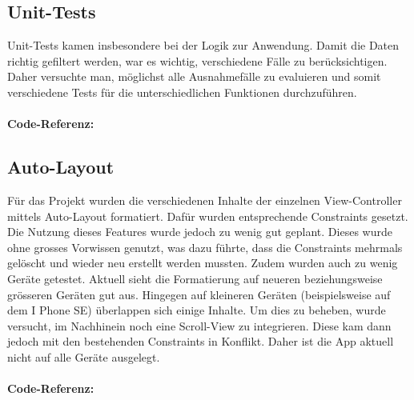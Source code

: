 \documentclass[12pt,titlepage]{article}
\begin{document}
\subsection{Unit-Tests}
Unit-Tests kamen insbesondere bei der Logik zur Anwendung. Damit die Daten richtig gefiltert werden, war es wichtig, verschiedene Fälle zu berücksichtigen. Daher versuchte man, möglichst alle Ausnahmefälle zu evaluieren und somit verschiedene Tests für die unterschiedlichen Funktionen durchzuführen.\\
\\
\textbf{Code-Referenz: }\\ 

\subsection{Auto-Layout}
Für das Projekt wurden die verschiedenen Inhalte der einzelnen View-Controller mittels Auto-Layout formatiert. Dafür wurden entsprechende Constraints gesetzt. Die Nutzung dieses Features wurde jedoch zu wenig gut geplant. Dieses wurde ohne grosses Vorwissen genutzt, was dazu führte, dass die Constraints mehrmals gelöscht und wieder neu erstellt werden mussten. Zudem wurden auch zu wenig Geräte getestet. Aktuell sieht die Formatierung auf neueren beziehungsweise grösseren Geräten gut aus. Hingegen auf kleineren Geräten (beispielsweise auf dem I Phone SE) überlappen sich einige Inhalte. Um dies zu beheben, wurde versucht, im Nachhinein noch eine Scroll-View zu integrieren. Diese kam dann jedoch mit den bestehenden Constraints in Konflikt. Daher ist die App aktuell nicht auf alle Geräte ausgelegt.\\
\\
\textbf{Code-Referenz: }\\ 
\end{document}
